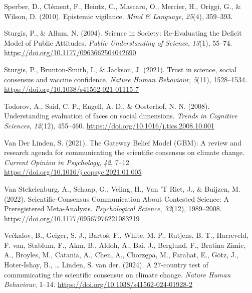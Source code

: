 \documentclass[
  jou,
  floatsintext,
  longtable,
  nolmodern,
  notxfonts,
  notimes,
  colorlinks=true,linkcolor=blue,citecolor=blue,urlcolor=blue]{apa7}
\newlength{\cslhangindent}
\newenvironment{CSLReferences}[2] %
 {\begin{list}{}{%
  \setlength{\itemindent}{0pt}
  \setlength{\leftmargin}{0pt}
  \setlength{\parsep}{0pt}
  \ifodd #1
   \setlength{\leftmargin}{\cslhangindent}
   \setlength{\itemindent}{-1\cslhangindent}
  \fi
  \setlength{\itemsep}{#2\baselineskip}}}
 {\end{list}}
\begin{document}
\begin{CSLReferences}{1}{0}
Sperber, D., Clément, F., Heintz, C., Mascaro, O., Mercier, H., Origgi,
G., \& Wilson, D. (2010). Epistemic vigilance. \emph{Mind \& Language},
\emph{25}(4), 359--393.

Sturgis, P., \& Allum, N. (2004). Science in Society: Re-Evaluating the
Deficit Model of Public Attitudes. \emph{Public Understanding of
Science}, \emph{13}(1), 55--74.
\url{https://doi.org/10.1177/0963662504042690}

Sturgis, P., Brunton-Smith, I., \& Jackson, J. (2021). Trust in science,
social consensus and vaccine confidence. \emph{Nature Human Behaviour},
\emph{5}(11), 1528--1534.
\url{https://doi.org/10.1038/s41562-021-01115-7}

Todorov, A., Said, C. P., Engell, A. D., \& Oosterhof, N. N. (2008).
Understanding evaluation of faces on social dimensions. \emph{Trends in
Cognitive Sciences}, \emph{12}(12), 455--460.
\url{https://doi.org/10.1016/j.tics.2008.10.001}

Van Der Linden, S. (2021). The Gateway Belief Model (GBM): A review and
research agenda for communicating the scientific consensus on climate
change. \emph{Current Opinion in Psychology}, \emph{42}, 7--12.
\url{https://doi.org/10.1016/j.copsyc.2021.01.005}

Van Stekelenburg, A., Schaap, G., Veling, H., Van 'T Riet, J., \&
Buijzen, M. (2022). Scientific-Consensus Communication About Contested
Science: A Preregistered Meta-Analysis. \emph{Psychological Science},
\emph{33}(12), 1989--2008.
\url{https://doi.org/10.1177/09567976221083219}

Većkalov, B., Geiger, S. J., Bartoš, F., White, M. P., Rutjens, B. T.,
Harreveld, F. van, Stablum, F., Akın, B., Aldoh, A., Bai, J., Berglund,
F., Bratina Zimic, A., Broyles, M., Catania, A., Chen, A., Chorzępa, M.,
Farahat, E., Götz, J., Hoter-Ishay, B., \ldots{} Linden, S. van der.
(2024). A 27-country test of communicating the scientific consensus on
climate change. \emph{Nature Human Behaviour}, 1--14.
\url{https://doi.org/10.1038/s41562-024-01928-2}


\end{CSLReferences}
\end{document}
